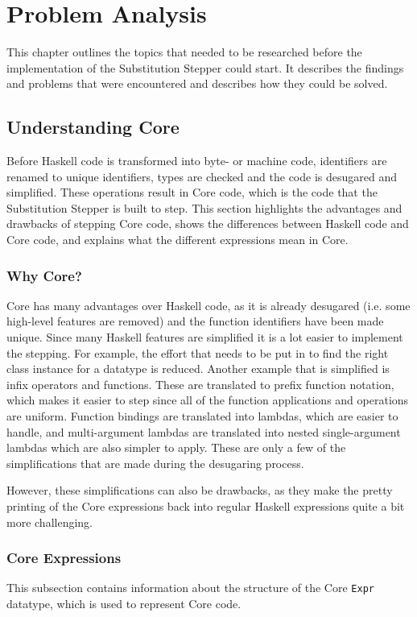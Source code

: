 \chapter{Problem Analysis}
This chapter outlines the topics that needed to be researched before the implementation of the Substitution Stepper could start.
It describes the findings and problems that were encountered and describes how they could be solved.

\section{Understanding Core}
Before Haskell code is transformed into byte- or machine code,
identifiers are renamed to unique identifiers, types are checked and the code is desugared and simplified.
These operations result in Core code, which is the code that the Substitution Stepper is built to step.
This section highlights the advantages and drawbacks of stepping Core code,
shows the differences between Haskell code and Core code,
and explains what the different expressions mean in Core.

\subsection{Why Core?}
Core has many advantages over Haskell code,
as it is already desugared (i.e. some high-level features are removed) and the function identifiers have been made unique.
Since many Haskell features are simplified it is a lot easier to implement the stepping.
For example, the effort that needs to be put in to find the right class instance for a datatype is reduced.
Another example that is simplified is infix operators and functions.
These are translated to prefix function notation, which makes it easier to step since all of the function applications and operations are uniform.
Function bindings are translated into lambdas, which are easier to handle,
and multi-argument lambdas are translated into nested single-argument lambdas which are also simpler to apply.
These are only a few of the simplifications that are made during the desugaring process.

However, these simplifications can also be drawbacks,
as they make the pretty printing of the Core expressions back into regular Haskell expressions quite a bit more challenging.

\subsection{Core Expressions}
This subsection contains information about the structure of the Core \texttt{Expr} datatype,
which is used to represent Core code.

